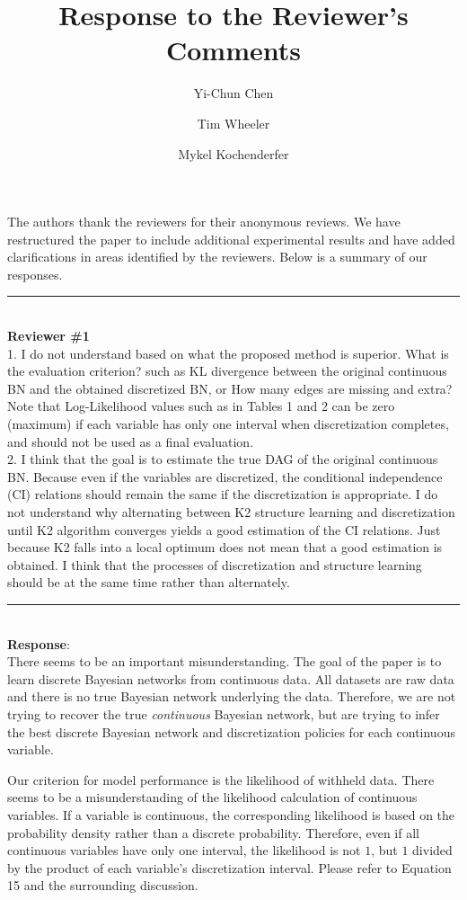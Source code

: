 \documentclass{article}
\title{Response to the Reviewer's Comments}
\author{Yi-Chun Chen \and Tim Wheeler \and Mykel Kochenderfer}
\begin{document}
\maketitle

The authors thank the reviewers for their anonymous reviews.
We have restructured the paper to include additional experimental results and have added clarifications in areas identified by the reviewers.
Below is a summary of our responses.

\noindent\rule{8cm}{0.4pt}\\
{\bf Reviewer \#1} \\

1. I do not understand based on what the proposed method is superior. What is the evaluation criterion? such as KL divergence between the original continuous BN and the obtained discretized BN, or How many edges are missing and extra? Note that Log-Likelihood values such as in Tables 1 and 2 can be zero
(maximum)  if each variable has only one interval when discretization
completes, and should not be used as a final evaluation.
\\

2. I think that the goal  is to estimate the true DAG of the original continuous BN. Because even if the variables are discretized, the conditional  independence (CI) relations should remain the same if the discretization is appropriate.  I do not understand why alternating between K2 structure learning  and discretization until K2 algorithm converges yields a good estimation of the CI relations.  Just because K2 falls into a local optimum does not mean that a good estimation is obtained.  I think that the processes of discretization and structure learning should be at the same time rather than alternately.

\noindent\rule{8cm}{0.4pt}\\
{\bf Response}:\\

There seems to be an important misunderstanding.
The goal of the paper is to learn discrete Bayesian networks from continuous data.
All datasets are raw data and there is no true Bayesian network underlying the data.
Therefore, we are not trying to recover the true \textit{continuous} Bayesian network, but are trying to infer the best discrete Bayesian network and discretization policies for each continuous variable.

Our criterion for model performance is the likelihood of withheld data.
There seems to be a misunderstanding of the likelihood calculation of continuous variables.
If a variable is continuous, the corresponding likelihood is based on the probability density rather than a discrete probability.
Therefore, even if all continuous variables have only one interval, the likelihood is not $1$, but $1$ divided by the product of each variable's discretization interval.
Please refer to Equation 15 and the surrounding discussion.
\end{document}
